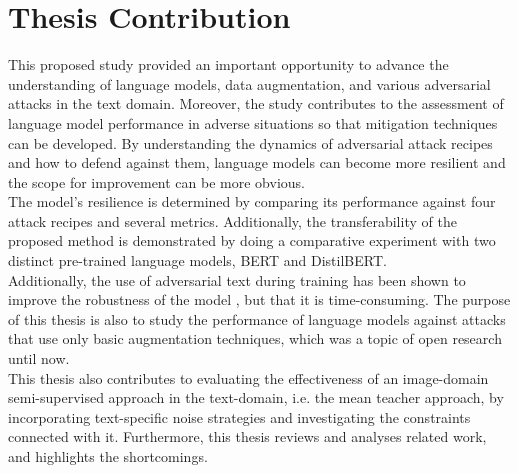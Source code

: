 \documentclass[%
	BCOR=8mm, %
	DIV=12,
	toc=bibliography, %
	toc=listof, %
	oneside, %
	egregdoesnotlikesansseriftitles, %
	]{scrbook}
\begin{document}
\section{Thesis Contribution}
This proposed study provided an important opportunity to advance the understanding of language models, data augmentation, and various adversarial attacks in the text domain. Moreover, the study contributes to the assessment of language model performance in adverse situations so that mitigation techniques can be developed. By understanding the dynamics of adversarial attack recipes and how to defend against them, language models can become more resilient and the scope for improvement can be more obvious. \\
The model's resilience is determined by comparing its performance against four attack recipes and several metrics. Additionally, the transferability of the proposed method is demonstrated by doing a comparative experiment with two distinct pre-trained language models, BERT and DistilBERT.\\
Additionally, the use of adversarial text during training has been shown to improve the robustness of the model \cite{li_textbugger_2019}, but that it is time-consuming. The purpose of this thesis is also to study the performance of language models against attacks that use only basic augmentation techniques, which was a topic of open research until now.\\
This thesis also contributes to evaluating the effectiveness of an image-domain semi-supervised approach in the text-domain, i.e. the mean teacher approach, by incorporating text-specific noise strategies and investigating the constraints connected with it. Furthermore, this thesis reviews and analyses related work, and highlights the shortcomings.
\end{document}
